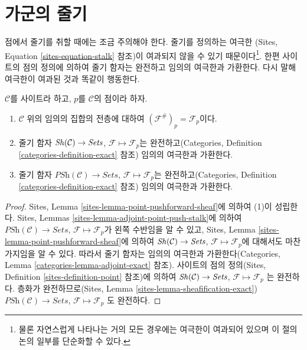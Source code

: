 \section{가군의 줄기}
\label{section-stalks}

\noindent
점에서 줄기를 취할 때에는 조금 주의해야 한다. 줄기를 정의하는 여극한
(Sites, Equation \ref{sites-equation-stalk} 참조)이 여과되지 않을 수 있기
때문이다\footnote{물론 자연스럽게 나타나는 거의 모든 경우에는 여극한이
여과되어 있으며 이 절의 논의 일부를 단순화할 수 있다.}. 한편 사이트의
점의 정의에 의하여 줄기 함자는 완전하고 임의의 여극한과 가환한다.
다시 말해 여극한이 여과된 것과 똑같이 행동한다.

\begin{lemma}
\label{lemma-stalk-exact}
$\mathcal{C}$를 사이트라 하고, $p$를 $\mathcal{C}$의 점이라 하자.
\begin{enumerate}
\item $\mathcal{C}$ 위의 임의의 집합의 전층에 대하여
$(\mathcal{F}^\#)_p = \mathcal{F}_p$이다.
\item 줄기 함자
$\mathop{\mathit{Sh}}\nolimits(\mathcal{C}) \to \textit{Sets}$,
$\mathcal{F} \mapsto \mathcal{F}_p$는 완전하고(Categories, Definition
\ref{categories-definition-exact} 참조) 임의의 여극한과 가환한다.
\item 줄기 함자
$\textit{PSh}(\mathcal{C}) \to \textit{Sets}$,
$\mathcal{F} \mapsto \mathcal{F}_p$는 완전하고(Categories, Definition
\ref{categories-definition-exact} 참조) 임의의 여극한과 가환한다.
\end{enumerate}
\end{lemma}

\begin{proof}
Sites, Lemma \ref{sites-lemma-point-pushforward-sheaf}에 의하여 (1)이
성립한다. Sites, Lemmas \ref{sites-lemma-adjoint-point-push-stalk}에 의하여
$\textit{PSh}(\mathcal{C}) \to \textit{Sets}$,
$\mathcal{F} \mapsto \mathcal{F}_p$가 왼쪽 수반임을 알 수 있고,
Sites, Lemma \ref{sites-lemma-point-pushforward-sheaf}에 의하여
$\mathop{\mathit{Sh}}\nolimits(\mathcal{C}) \to \textit{Sets}$,
$\mathcal{F} \mapsto \mathcal{F}_p$에 대해서도 마찬가지임을 알 수 있다.
따라서 줄기 함자는 임의의 여극한과 가환한다(Categories, Lemma
\ref{categories-lemma-adjoint-exact} 참조). 사이트의 점의 정의(Sites,
Definition \ref{sites-definition-point} 참조)에 의하여
$\mathop{\mathit{Sh}}\nolimits(\mathcal{C}) \to \textit{Sets}$,
$\mathcal{F} \mapsto \mathcal{F}_p$
는 완전하다. 층화가 완전하므로(Sites, Lemma
\ref{sites-lemma-sheafification-exact})
$\textit{PSh}(\mathcal{C}) \to \textit{Sets}$,
$\mathcal{F} \mapsto \mathcal{F}_p$
도 완전하다.
\end{proof}

